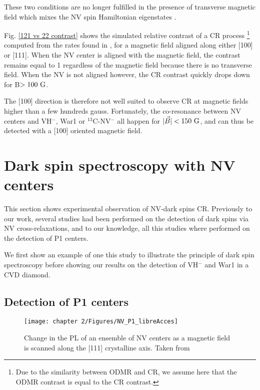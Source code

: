 \documentclass[a4paper, 11pt]{report}
\begin{document}
These two conditions are no longer fulfilled in the presence of transverse magnetic field which mixes the NV spin Hamiltonian eigenstates \citep{tetienne2012magnetic}.

Fig. \ref{121 vs 22 contrast} shows the simulated relative contrast of a CR process \footnote{Due to the similarity between ODMR and CR, we assume here that the ODMR contrast is equal to the CR contrast.} computed from the rates found in \citep{tetienne2012magnetic}, for a magnetic field aligned along either [100] or [111]. When the NV center is aligned with the magnetic field, the contrast remains equal to 1 regardless of the magnetic field because there is no transverse field. When the NV is not aligned however, the CR contrast quickly drops down for B$>100\ \rm G$.

The [100] direction is therefore not well suited to observe CR at magnetic fields higher than a few hundreds gauss. Fortunately, the co-resonance between NV centers and VH$^-$, War1 or $^{13}$C-NV$^-$ all happen for $|\vec{B}| < 150 \ \rm G$, and can thus be detected with a [100] oriented magnetic field. 

\section{Dark spin spectroscopy with NV centers}
This section shows experimental observation of NV-dark spins CR. Previously to our work, several studies \citep{van1989cross, holliday1989optical, epstein2005anisotropic, armstrong2010nv, hall2016detection, wickenbrock2016microwave, wood2016wide, alfasi2019detection, lazda2021cross} had been performed on the detection of dark spins via NV cross-relaxations, and to our knowledge, all this studies where performed on the detection of P1 centers. 

We first show an example of one this study to illustrate the principle of dark spin spectroscopy before showing our results on the detection of VH$^-$ and War1 in a CVD diamond.

\subsection{Detection of P1 centers}

\begin{figure}[h]
\centering
\texttt{[image: chapter 2/Figures/NV\_P1\_libreAcces]}
\caption{Change in the PL of an ensemble of NV centers as a magnetic field is scanned along the [111] crystalline axis. Taken from \citep{armstrong2010nv}}
\label{CR P1 exp}
\end{figure}
\end{document}
